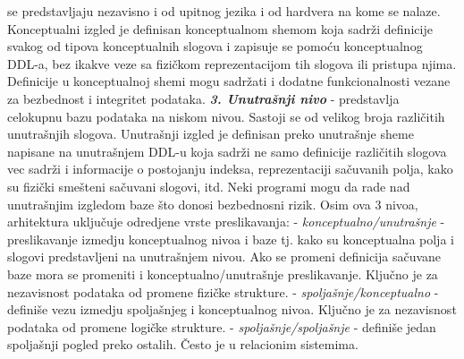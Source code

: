 \documentclass{article}
\begin{document}
se predstavljaju nezavisno i od upitnog jezika i od hardvera na kome se
nalaze. Konceptualni izgled je definisan konceptualnom shemom koja
sadrži definicije svakog od tipova konceptualnih slogova i zapisuje se
pomoću konceptualnog DDL-a, bez ikakve veze sa fizičkom reprezentacijom
tih slogova ili pristupa njima. Definicije u konceptualnoj shemi mogu
sadržati i dodatne funkcionalnosti vezane za bezbednost i integritet
podataka.
\newline \hspace*{0.2cm}
\textbf{\textit{3. Unutrašnji nivo}} - predstavlja celokupnu bazu
podataka na niskom nivou. Sastoji se od velikog broja različitih
unutrašnjih slogova. Unutrašnji izgled je definisan preko unutrašnje
sheme napisane na unutrašnjem DDL-u koja sadrži ne samo definicije
različitih slogova vec sadrži i informacije o postojanju indeksa,
reprezentaciji sačuvanih polja, kako su fizički smešteni sačuvani
slogovi, itd. Neki programi mogu da rade nad unutrašnjim izgledom baze
što donosi bezbednosni rizik.
\newline
Osim ova 3 nivoa,
arhitektura uključuje odredjene vrste preslikavanja:
\newline \hspace*{0.2cm}
- \textit{konceptualno/unutrašnje} - preslikavanje izmedju
konceptualnog nivoa i baze tj. kako su konceptualna polja i slogovi
predstavljeni na unutrašnjem nivou. Ako se promeni definicija sačuvane
baze mora se promeniti i konceptualno/unutrašnje preslikavanje. Ključno
je za nezavisnost podataka od promene fizičke strukture.
\newline \hspace*{0.2cm}
- \textit{spoljašnje/konceptualno} - definiše vezu izmedju spoljašnjeg
i konceptualnog nivoa. Ključno je za nezavisnost podataka od promene
logičke strukture.
\newline \hspace*{0.2cm}
- \textit{spoljašnje/spoljašnje} - definiše jedan spoljašnji pogled
preko ostalih. Često je u relacionim sistemima.
\end{document}
